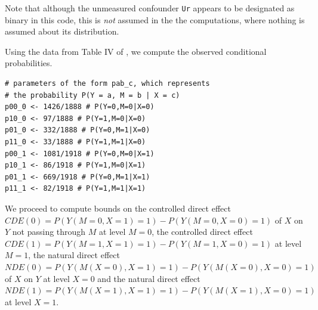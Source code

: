 Note that although the unmeasured confounder \texttt{Ur} appears to be designated as binary in this code, this is \emph{not} assumed in the the computations, where nothing is assumed about its distribution.

Using the data from Table IV of \citet{sjolandernaturaldirecteffects}, we compute the observed conditional probabilities.

\begin{verbatim}
# parameters of the form pab_c, which represents 
# the probability P(Y = a, M = b | X = c)
p00_0 <- 1426/1888 # P(Y=0,M=0|X=0)
p10_0 <- 97/1888 # P(Y=1,M=0|X=0)
p01_0 <- 332/1888 # P(Y=0,M=1|X=0)
p11_0 <- 33/1888 # P(Y=1,M=1|X=0)
p00_1 <- 1081/1918 # P(Y=0,M=0|X=1)
p10_1 <- 86/1918 # P(Y=1,M=0|X=1)
p01_1 <- 669/1918 # P(Y=0,M=1|X=1)
p11_1 <- 82/1918 # P(Y=1,M=1|X=1)
\end{verbatim}

We proceed to compute bounds on the controlled direct effect \(CDE(0) = P(Y(M = 0, X = 1) = 1) - P(Y(M = 0, X = 0) = 1)\) of \(X\) on \(Y\) not passing through \(M\) at level \(M=0\), the controlled direct effect \(CDE(1) = P(Y(M = 1, X = 1) = 1) - P(Y(M = 1, X = 0) = 1)\) at level \(M=1\), the natural direct effect \(NDE(0) = P(Y(M(X = 0), X = 1) = 1) - P(Y(M(X = 0), X = 0) = 1)\) of \(X\) on \(Y\) at level \(X=0\) and the natural direct effect \(NDE(1) = P(Y(M(X = 1), X = 1) = 1) - P(Y(M(X = 1), X = 0) = 1)\) at level \(X=1\).

